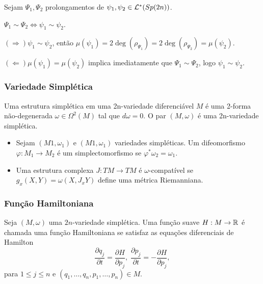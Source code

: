 \documentclass{beamer}
\begin{document}
\begin{footnotesize}
\begin{frame}
\begin{prova}
\begin{enumerate}
				\begin{itemize}
				\end{itemize}	
			\end{enumerate}
			
		\end{prova}
	\end{frame}
	

	\begin{frame}
		\frametitle{Variedade Simplética}
		\begin{definicao}
			
			Uma estrutura simplética em uma 2n-variedade diferenciável $M$ é uma 2-forma não-degenerada $\omega\in \Omega^{2}(M)$ tal que $d\omega=0$. O par $(M, \omega)$ é uma 2n-variedade simplética.
		\end{definicao}
		
		\begin{itemize}
			\item Sejam $(M1, \omega_{1})$ e $(M1, \omega_{1})$ variedades simpléticas. Um difeomorfismo $\varphi: M_1\to M_2$ é um simplectomorfismo se $\varphi^{*}\omega_{2}=\omega_{1}$.
			
			\item Uma estrutura complexa $J:TM\to TM$ é $\omega$-compatível se $g_{x}(X,Y) = \omega(X, J_{x}Y)$ define uma métrica Riemanniana.
		\end{itemize}
		
	\end{frame}
	
	\begin{frame}
		\frametitle{Função Hamiltoniana}
		\begin{definicao}
			Seja $(M, \omega)$ uma $2n$-variedade simplética. Uma função suave $H : M \to \mathbb{R}^{}$ é chamada uma função Hamiltoniana se satisfaz as equações diferenciais de Hamilton
			$$
			\frac{\partial q_{j}}{\partial t} = \frac{\partial H}{\partial p_{j}}, \; \frac{\partial p_{j}}{\partial t} = -\frac{\partial H}{\partial p_{j}},
			$$
			para $1\leq j \leq n$ e $(q_{1}, \dots, q_{n}, p_{1}, \dots, p_{n}) \in M$.
		\end{definicao}
		

\end{frame}
\end{footnotesize}
\end{document}
